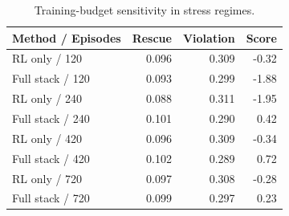 \begin{table}[t]
  \centering
  \caption{Training-budget sensitivity in stress regimes.}
  \label{tab:training_budget}
  \begin{tabular}{lrrr}
    \toprule
    Method / Episodes & Rescue & Violation & Score \\
    \midrule
    RL only / 120 & 0.096 & 0.309 & -0.32 \\
    Full stack / 120 & 0.093 & 0.299 & -1.88 \\
    \midrule
    RL only / 240 & 0.088 & 0.311 & -1.95 \\
    Full stack / 240 & 0.101 & 0.290 & 0.42 \\
    \midrule
    RL only / 420 & 0.096 & 0.309 & -0.34 \\
    Full stack / 420 & 0.102 & 0.289 & 0.72 \\
    \midrule
    RL only / 720 & 0.097 & 0.308 & -0.28 \\
    Full stack / 720 & 0.099 & 0.297 & 0.23 \\
    \bottomrule
  \end{tabular}
\end{table}
